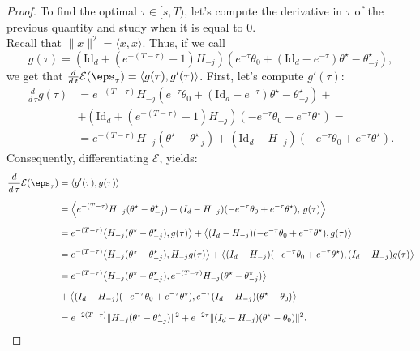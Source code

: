 \begin{proof}
To find the optimal $\tau\in [s,T)$, let's compute the derivative in $\tau$ of the previous quantity and study when it is equal to $0$.\\
Recall that $\|x\|^2=\langle x,x \rangle$. 
Thus, if we call 
\begin{equation*}
  g(\tau) = \left(\mathrm{Id}_d + (e^{-(T-\tau)}-1) H_{-j} \right) (e^{-\tau} \theta_0 +(\mathrm{Id}_d-e^{-\tau})\theta^\star-\theta^\star_{-j}),
\end{equation*}
we get that $\frac{d}{d\,t}\mathcal{E}(\eps_\tau)= \langle g(\tau), g'(\tau) \rangle$.
First, let's compute $g'(\tau)$:
\begin{equation*}
  \begin{aligned}
    \frac{d}{d\,\tau}g(\tau) &= e^{-(T-\tau)}H_{-j} (e^{-\tau} \theta_0 +(\mathrm{Id}_d-e^{-\tau})\theta^\star-\theta^\star_{-j}) + \\
    & + \left(\mathrm{Id}_d + (e^{-(T-\tau)}-1) H_{-j} \right)(-e^{-\tau} \theta_0 +e^{-\tau}\theta^\star) =\\
    & = e^{-(T-\tau)} H_{-j}(\theta^\star -\theta^\star_{-j}) +\left(\mathrm{Id}_d - H_{-j} \right)(-e^{-\tau} \theta_0 +e^{-\tau}\theta^\star).
    \end{aligned}
\end{equation*}
Consequently, differentiating $\mathcal{E}$, yields:
\begin{equation*}
  \begin{aligned}
    \frac{d}{d\,\tau}\mathcal{E}(\eps_\tau)
    & = \langle g'(\tau), g(\tau) \rangle \\[0.2cm]
    & = \Big\langle
    e^{-(T-\tau)} H_{-j}(\theta^\star-\theta^\star_{-j})
    + (I_d-H_{-j})(-e^{-\tau}\theta_0 + e^{-\tau}\theta^\star), \,
    g(\tau)
    \Big\rangle \\[0.2cm]
    & = e^{-(T-\tau)}
    \big\langle H_{-j}(\theta^\star-\theta^\star_{-j}), g(\tau)\big\rangle
    + \big\langle (I_d-H_{-j})(-e^{-\tau}\theta_0 + e^{-\tau}\theta^\star),
    g(\tau)\big\rangle \\[0.2cm]
    & = e^{-(T-\tau)}
    \big\langle H_{-j}(\theta^\star-\theta^\star_{-j}),
    H_{-j} g(\tau)\big\rangle
    + \big\langle (I_d-H_{-j})(-e^{-\tau}\theta_0 + e^{-\tau}\theta^\star),
    (I_d-H_{-j}) g(\tau)\big\rangle \\[0.2cm]
    & = e^{-(T-\tau)}
    \big\langle H_{-j}(\theta^\star-\theta^\star_{-j}),
    e^{-(T-\tau)} H_{-j}(\theta^\star-\theta^\star_{-j})\big\rangle \\[0.2cm]
    &
    + \big\langle (I_d-H_{-j})(-e^{-\tau}\theta_0 + e^{-\tau}\theta^\star),
    e^{-\tau}(I_d-H_{-j})(\theta^\star-\theta_0)\big\rangle \\[0.2cm]
    & = e^{-2(T-\tau)}\|H_{-j}(\theta^\star-\theta^\star_{-j})\|^2
    + e^{-2\tau}\|(I_d-H_{-j})(\theta^\star-\theta_0)\|^2 .
  \end{aligned}
\end{equation*}


\end{proof}
